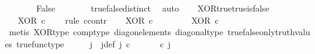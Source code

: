 \begin{isabellebody}
\ \ \ \ \isamarkupfalse%
\ \isamarkupfalse%
\ False\isanewline
\ \ \ \ \ \ \isamarkupfalse%
\ true{\isacharunderscore}{\kern0pt}false{\isacharunderscore}{\kern0pt}distinct\ \isamarkupfalse%
\ auto\isanewline
\ \ \isamarkupfalse%
\isanewline
{}\isamarkupfalse%
%
\endisatagproof
{\isafoldproof}%
%
\isadelimproof
\isanewline
%
\endisadelimproof
\isanewline
{}\isamarkupfalse%
\ XOR{\isacharunderscore}{\kern0pt}true{\isacharunderscore}{\kern0pt}true{\isacharunderscore}{\kern0pt}is{\isacharunderscore}{\kern0pt}false{\isacharcolon}{\kern0pt}\isanewline
\ \ \ {\isachardoublequoteopen}XOR\ {\isasymcirc}\isactrlsub c\ \ {\isasymlangle}{\isasymt}{\isacharcomma}{\kern0pt}{\isasymt}{\isasymrangle}\ {\isacharequal}{\kern0pt}\ {\isasymf}{\isachardoublequoteclose}\isanewline
%
\isadelimproof
%
\endisadelimproof
%
\isatagproof
{}\isamarkupfalse%
{\isacharparenleft}{\kern0pt}rule\ ccontr{\isacharparenright}{\kern0pt}\isanewline
\ \ \isamarkupfalse%
\ {\isachardoublequoteopen}XOR\ {\isasymcirc}\isactrlsub c\ {\isasymlangle}{\isasymt}{\isacharcomma}{\kern0pt}{\isasymt}{\isasymrangle}\ {\isasymnoteq}\ {\isasymf}{\isachardoublequoteclose}\isanewline
\ \ \isamarkupfalse%
\ \isamarkupfalse%
\ {\isachardoublequoteopen}XOR\ {\isasymcirc}\isactrlsub c\ {\isasymlangle}{\isasymt}{\isacharcomma}{\kern0pt}{\isasymt}{\isasymrangle}\ \ {\isacharequal}{\kern0pt}\ {\isasymt}{\isachardoublequoteclose}\isanewline
\ \ \ \ \isamarkupfalse%
\ {\isacharparenleft}{\kern0pt}metis\ XOR{\isacharunderscore}{\kern0pt}type\ comp{\isacharunderscore}{\kern0pt}type\ diag{\isacharunderscore}{\kern0pt}on{\isacharunderscore}{\kern0pt}elements\ diagonal{\isacharunderscore}{\kern0pt}type\ true{\isacharunderscore}{\kern0pt}false{\isacharunderscore}{\kern0pt}only{\isacharunderscore}{\kern0pt}truth{\isacharunderscore}{\kern0pt}values\ true{\isacharunderscore}{\kern0pt}func{\isacharunderscore}{\kern0pt}type{\isacharparenright}{\kern0pt}\isanewline
\ \ \isamarkupfalse%
\ \isamarkupfalse%
\ j\ \ j{\isacharunderscore}{\kern0pt}def{\isacharcolon}{\kern0pt}\ {\isachardoublequoteopen}j\ {\isasymin}\isactrlsub c\ {\isasymone}{\isasymCoprod}{\isasymone}\ {\isasymand}\ {\isacharparenleft}{\kern0pt}{\isasymlangle}{\isasymt}{\isacharcomma}{\kern0pt}\ {\isasymf}{\isasymrangle}\ {\isasymamalg}{\isasymlangle}{\isasymf}{\isacharcomma}{\kern0pt}\ {\isasymt}{\isasymrangle}{\isacharparenright}{\kern0pt}\ {\isasymcirc}\isactrlsub c\ j\ \ {\isacharequal}{\kern0pt}\ {\isasymlangle}{\isasymt}{\isacharcomma}{\kern0pt}{\isasymt}{\isasymrangle}{\isachardoublequoteclose}\isanewline

\end{isabellebody}
